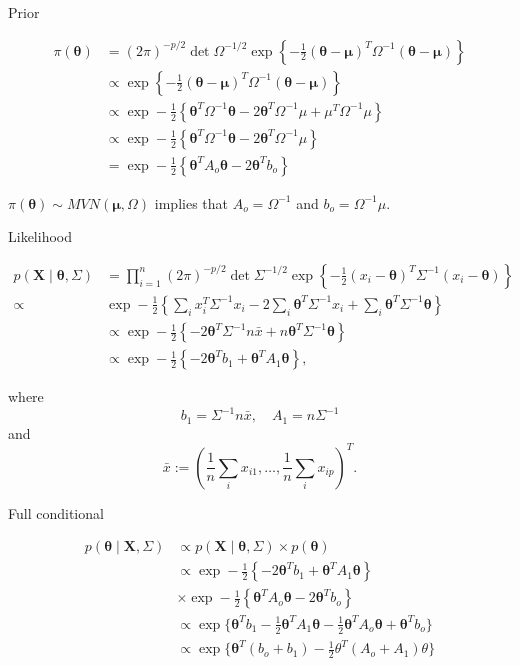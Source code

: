 \documentclass[ignorenonframetext,]{beamer}
\newcommand{\btheta}{{\bm\theta}}
\newcommand{\bmu}{\bm{\mu}}
\newcommand{\bx}{\ensuremath{\mathbf{X}}}
\begin{document}
\begin{frame}{Prior}

\begin{align}
\pi(\btheta) &= {\left(2\pi\right)}^{-p/2}\det{\Omega}^{-1/2} \exp{\left\{-\frac{1}{2} (\btheta-\bmu)^T\Omega^{-1} (\btheta - \bmu)\right\}} \\
& \propto \exp{\left\{-\frac{1}{2} (\btheta-\bmu)^T\Omega^{-1} (\btheta - \bmu)\right\}} \\
& \propto \exp-\frac{1}{2} {\left \{\btheta^T\Omega^{-1} \btheta - 2 \btheta^T \Omega^{-1} \mu + \mu^T \Omega^{-1} \mu \right \}} \\
& \propto \exp-\frac{1}{2} {\left \{\btheta^T\Omega^{-1} \btheta - 2 \btheta^T \Omega^{-1} \mu  \right \}}\\
&= \exp-\frac{1}{2} {\left \{\btheta^TA_o \btheta - 2 \btheta^T  b_o  \right \}}
\end{align}

\(\pi(\btheta) \sim MVN(\bmu, \Omega)\) implies that
\(A_o = \Omega^{-1}\) and \(b_o = \Omega^{-1} \mu.\)

\end{frame}

\begin{frame}{Likelihood}

\begin{align}
p(\bx \mid \btheta, \Sigma) &= \prod_{i=1}^n
{\left(2\pi\right)}^{-p/2}\det{\Sigma}^{-1/2} \exp{\left\{-\frac{1}{2} (x_i-\btheta)^T\Sigma^{-1} (x_i - \btheta)\right\}}\\
\propto 
& \exp-\frac{1}{2} {\left \{ \sum_i x_i^T \Sigma^{-1} x_i -2 \sum_i \btheta^T \Sigma^{-1} x_i + 
\sum_i \btheta^T\Sigma^{-1} \btheta 
 \right \}}\\
 & \propto \exp-\frac{1}{2} {\left \{  -2 \btheta^T \Sigma^{-1} n\bar{x} + 
n \btheta^T\Sigma^{-1} \btheta 
 \right \}}\\
  & \propto \exp-\frac{1}{2} {\left \{  -2 \btheta^T b_1+ 
\btheta^T A_1 \btheta \right \}},
\end{align}

where \[b_1= \Sigma^{-1} n\bar{x}, \quad A_1 = n\Sigma^{-1}\] and
\[\bar{x} := (\frac{1}{n}\sum_i x_{i1} ,\ldots, \frac{1}{n} \sum_i x_{ip})^T.\]

\end{frame}

\begin{frame}{Full conditional}

\begin{align}
p(\btheta \mid \bx, \Sigma) &\propto
p(\bx \mid \btheta, \Sigma) \times p(\btheta) \\
&\propto 
\exp-\frac{1}{2} {\left \{  -2 \btheta^T b_1+ 
\btheta^T A_1 \btheta \right \}} \\
&\times
\exp-\frac{1}{2} {\left \{\btheta^TA_o \btheta - 2 \btheta^T b_o  \right \}}\\
&\propto \exp\{\btheta^T b_1 - \frac{1}{2}\btheta^T A_1 \btheta- \frac{1}{2}\btheta^TA_o  \btheta
+ \btheta^T b_o\}\\
& \propto\exp\{
\btheta^T( b_o + b_1) -\frac{1}{2}\theta^T(A_o + A_1) \theta
\}
\end{align}

\end{frame}
\end{document}
